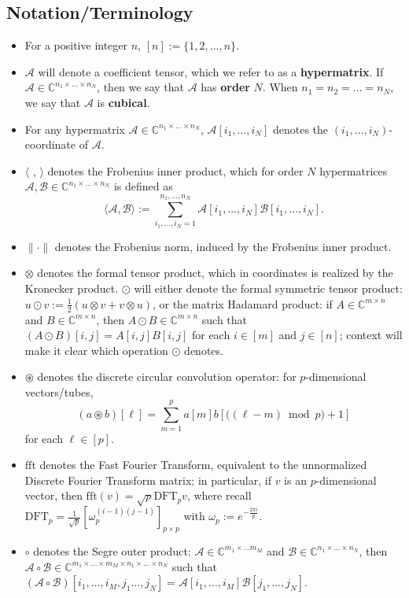 \documentclass[11pt]{article}
\begin{document}
\subsection{Notation/Terminology}
\begin{itemize}
    \item For a positive integer $n$, $[n] := \{1,2,\dots,n\}$. 
    \item $\mathcal{A}$ will denote a coefficient tensor, which we refer to as a \textbf{hypermatrix}. If $\mathcal{A}\in \mathbb{C}^{n_1\times\dots\times n_N}$, then we say that $\mathcal{A}$ has \textbf{order} $N$. When $n_1=n_2=\dots=n_N$, we say that $\mathcal{A}$ is \textbf{cubical}.  
    \item For any hypermatrix $\mathcal{A}\in \mathbb{C}^{n_1\times\dots\times n_N}$, $\mathcal{A}[i_1,\dots,i_N]$ denotes the $(i_1,\dots,i_N)$-coordinate of $\mathcal{A}$.
    \item $\langle\text{ , }\rangle$ denotes the Frobenius inner product, which for order $N$ hypermatrices $\mathcal{A},\mathcal{B}\in \mathbb{C}^{n_1\times\dots\times n_N}$ is defined as 
    \[\langle \mathcal{A},\mathcal{B}\rangle := \sum\limits_{i_1,\dots,i_N=1}^{n_1,\dots,n_N}\mathcal{A}[i_1,\dots,i_N]\mathcal{B}[i_1,\dots,i_N].\]
    \item $\|\cdot\|$ denotes the Frobenius norm, induced by the Frobenius inner product. 
    \item $\otimes$ denotes the formal tensor product, which in coordinates is realized by the Kronecker product. $\odot$ will either denote the formal symmetric tensor product: $u\odot v := \frac{1}{2}(u\otimes v+v\otimes u)$, or the matrix Hadamard product: if $A\in \mathbb{C}^{m\times n}$ and $B\in \mathbb{C}^{m\times n}$, then $A\odot B\in \mathbb{C}^{m\times n}$ such that $(A\odot B)[i,j] = A[i,j]B[i,j]$ for each $i\in [m]$ and $j\in [n]$; context will make it clear which operation $\odot$ denotes. 
    \item $\circledast$ denotes the discrete circular convolution operator: for $p$-dimensional vectors/tubes, 
    \[(a\circledast b)[\ell] = \sum\limits_{m=1}^pa[m]b\left[\big((\ell-m)\bmod p\big)+1\right]\] 
    for each $\ell\in [p]$. 
    \item $\mathrm{fft}$ denotes the Fast Fourier Transform, equivalent to the unnormalized Discrete Fourier Transform matrix; in particular, if $v$ is an $p$-dimensional vector, then $\mathrm{fft}(v) = \sqrt{p}\mathrm{DFT}_pv$, where recall $\mathrm{DFT}_p = \frac{1}{\sqrt{p}}\left[\omega_p^{(i-1)(j-1)}\right]_{p\times p}$ with $\omega_p := e^{-\frac{2\pi i}{p}}$. 
    \item $\circ$ denotes the Segre outer product: $\mathcal{A}\in \mathbb{C}^{m_1\times \dots m_M}$ and $\mathcal{B}\in \mathbb{C}^{n_1\times\dots\times n_N}$, then $\mathcal{A}\circ \mathcal{B}\in \mathbb{C}^{m_1\times\dots\times m_M\times n_1\times\dots\times n_N}$ such that $(\mathcal{A}\circ \mathcal{B})[i_1,\dots,i_M,j_1\dots,j_N] = \mathcal{A}[i_1,\dots,i_M]\mathcal{B}[j_1,\dots,j_N]$. 
\end{itemize}
\end{document}
